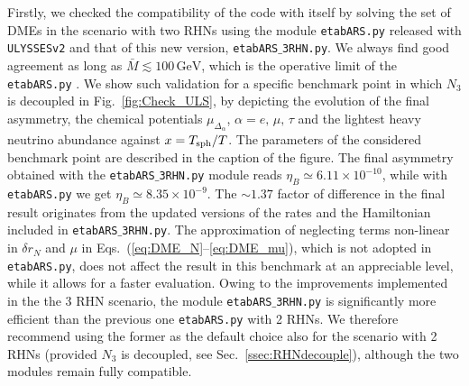 \documentclass[12pt, a4paper]{article}
\def\Mav{\bar{M}}
\begin{document}
Firstly, we checked the compatibility of the code with itself by solving the set of DMEs in the scenario with two RHNs using the module \texttt{etabARS.py} released with \texttt{ULYSSESv2} and that of this new version, \texttt{etabARS$\_$3RHN.py}. We always find good agreement as long as $\Mav \lesssim 100\,\text{GeV}$, which is the operative limit of the \texttt{etabARS.py} \cite{Granelli:2023vcm}. We show such validation for a specific benchmark point in which $N_3$ is decoupled in Fig.~\ref{fig:Check_ULS}, by depicting the evolution of the final asymmetry, the chemical potentials $\mu_{\Delta_\alpha}$, $\alpha = e,\,\mu,\,\tau$ and the lightest heavy neutrino abundance against $x=T_{\rm sph}/T$. The parameters of the considered benchmark point are described in the caption of the figure. The final asymmetry obtained with the \texttt{etabARS$\_$3RHN.py} module reads $\eta_B \simeq 6.11\times 10^{-10}$, while with \texttt{etabARS.py} we get $\eta_B \simeq 8.35\times 10^{-9}$. The $\sim 1.37$ factor of difference in the final result originates from the updated versions of the rates and the Hamiltonian included in \texttt{etabARS$\_$3RHN.py}. The approximation of neglecting terms non-linear in $\delta r_N$ and $\mu$ in Eqs.~(\ref{eq:DME_N}–\ref{eq:DME_mu}), which is not adopted in \texttt{etabARS.py}, does not affect the result in this benchmark at an appreciable level, while it allows for a faster evaluation. Owing to the improvements implemented in the the 3 RHN scenario, the module \texttt{etabARS$\_$3RHN.py} is significantly more efficient than the previous one \texttt{etabARS.py} with 2 RHNs. We therefore recommend using the former as the default choice also for the scenario with 2 RHNs (provided $N_3$ is decoupled, see Sec.~\ref{ssec:RHNdecouple}), although the two modules remain fully compatible.
\end{document}
